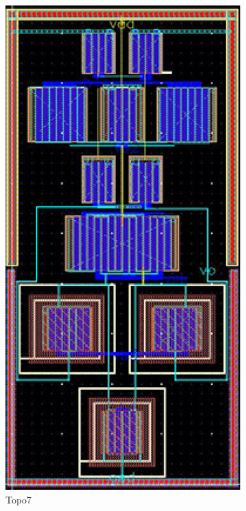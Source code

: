 \begin{figure}[ht]
\begin{subfigure}[t]{0.2\textwidth}
      \includegraphics[width=\textwidth]{Fig/MultTopo_Topo7.eps}
      \caption{Topo7}\label{fig:Topo7}
      \end{subfigure}
      \begin{subfigure}[t]{0.2\textwidth}

\end{subfigure}
\end{figure}
